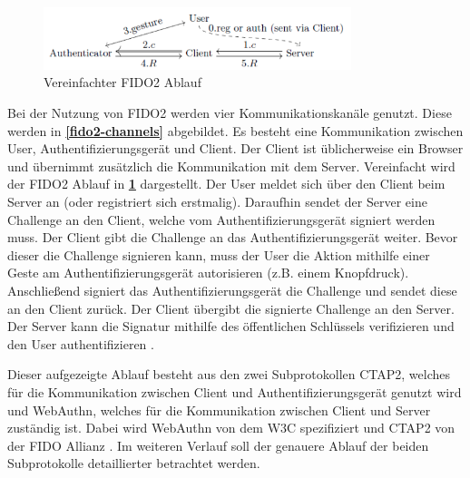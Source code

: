 \begin{figure}[h]
	\centering 
	\includegraphics[width=0.8\textwidth]{img/abbildungen/fido2_flow.png}
	\captionsetup{format=hang}
	\caption{Vereinfachter FIDO2 Ablauf \cite{barbosa2021provable}} \label{fido2-simple}
\end{figure}

Bei der Nutzung von \ac{FIDO}2 werden vier Kommunikationskanäle genutzt. Diese werden in \textbf{\ref{fido2-channels}} abgebildet. Es besteht eine Kommunikation zwischen User, Authentifizierungsgerät und Client. Der Client ist üblicherweise ein Browser und übernimmt zusätzlich die Kommunikation mit dem Server. Vereinfacht wird der \ac{FIDO}2 Ablauf in \textbf{\ref{fido2-simple}} dargestellt. Der User meldet sich über den Client beim Server an (oder registriert sich erstmalig). Daraufhin sendet der Server eine Challenge an den Client, welche vom Authentifizierungsgerät signiert werden muss. Der Client gibt die Challenge an das Authentifizierungsgerät weiter. Bevor dieser die Challenge signieren kann, muss der User die Aktion mithilfe einer Geste am Authentifizierungsgerät autorisieren (z.B. einem Knopfdruck). Anschließend signiert das Authentifizierungsgerät die Challenge und sendet diese an den Client zurück. Der Client übergibt die signierte Challenge an den Server. Der Server kann die Signatur mithilfe des öffentlichen Schlüssels verifizieren und den User authentifizieren \cite{farke2020you} \cite{lyastani2020fido2}.

Dieser aufgezeigte Ablauf besteht aus den zwei Subprotokollen \ac{CTAP2}, welches für die Kommunikation zwischen Client und Authentifizierungsgerät genutzt wird und WebAuthn, welches für die Kommunikation zwischen Client und Server zuständig ist. Dabei wird WebAuthn von dem \ac{W3C} spezifiziert und \ac{CTAP2} von der \ac{FIDO} Allianz \cite{farke2020you}. Im weiteren Verlauf soll der genauere Ablauf der beiden Subprotokolle detaillierter betrachtet werden.

